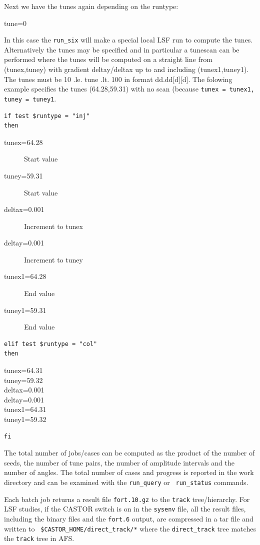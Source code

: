 \documentclass{cernatsnote}
\begin{document}
Next we have the tunes again depending on the runtype:
\begin{description} 
\item[tune=0]
\end{description} 
In this case the \texttt{run\_six} will make a special local LSF run to compute
the tunes. Alternatively the tunes may be specified and in particular a
tunescan can be performed where the tunes will be computed on a straight line
from (tunex,tuney) with gradient deltay/deltax up to and including
(tunex1,tuney1).  The tunes must be 10 .le. tune .lt. 100 in format
dd.dd[d][d].  The folowing example specifies the tunes (64.28,59.31) with no
scan (because \texttt{tunex = tunex1, tuney = tuney1}. 
\begin{verbatim}
if test $runtype = "inj"
then
\end{verbatim}
\begin{description}
\item[tunex=64.28] Start value
\item[tuney=59.31] Start value
\item[deltax=0.001] Increment to tunex
\item[deltay=0.001] Increment to tuney
\item[tunex1=64.28] End value
\item[tuney1=59.31] End value
\end{description}
\begin{verbatim}
elif test $runtype = "col"
then
\end{verbatim}
\begin{description}
\item[tunex=64.31]
\item[tuney=59.32]
\item[deltax=0.001]
\item[deltay=0.001]
\item[tunex1=64.31]
\item[tuney1=59.32]
\end{description}
\begin{verbatim}
fi
\end{verbatim}
The total number of jobs/cases can be computed as the product of the number of
seeds, the number of tune pairs, the number of amplitude intervals and the
number of angles.  The total number of cases and progress is reported in the
work directory and can be examined with the \texttt{run\_query} or {\tt
run\_status} commands.

Each batch job returns a result file \texttt{fort.10.gz} to the \texttt{track}
tree/hierarchy. For LSF studies, if the CASTOR switch is on in the \texttt{sysenv}
file, all the result files, including the binary files and the \texttt{fort.6}
output, are compressed in a tar file and written to \texttt{
\$CASTOR\_HOME/direct\_track/*} where the \texttt{direct\_track} tree matches the
\texttt{track} tree in AFS.
\end{document}
